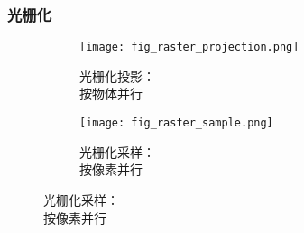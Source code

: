 \begin{frame}
    \frametitle{光栅化}
    \begin{figure}[H]
        \centering
        \begin{subfigure}{0.68\textwidth}
            \centering
            \texttt{[image: fig\_raster\_projection.png]}
            \caption{光栅化投影：\\ 按物体并行}
        \end{subfigure}
        \begin{subfigure}{0.3\textwidth}
            \texttt{[image: fig\_raster\_sample.png]}
            \caption{光栅化采样：\\ 按像素并行}
        \end{subfigure}
    \end{figure}
\end{frame}
